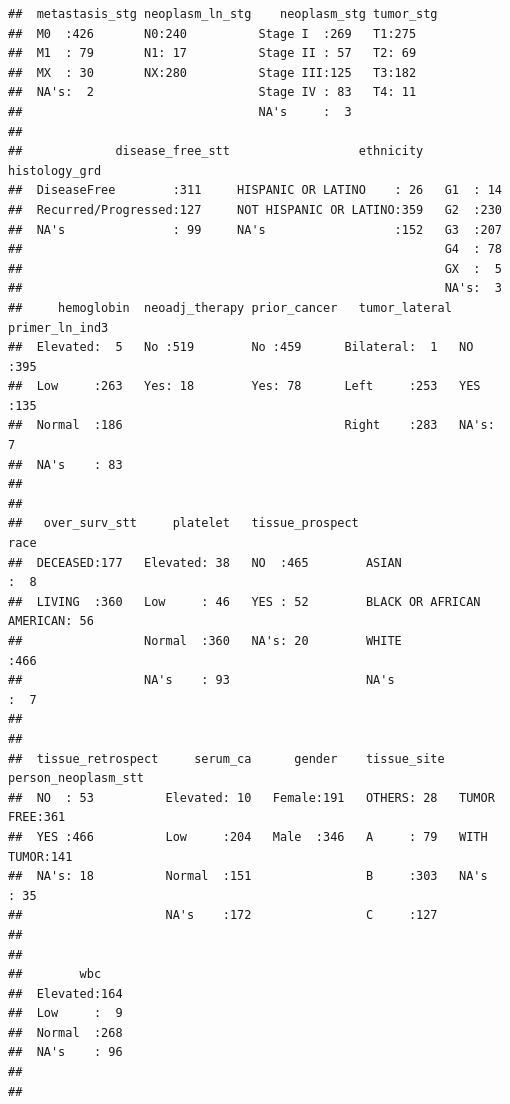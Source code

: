 \documentclass[]{article}
\begin{document}
\begin{verbatim}
##  metastasis_stg neoplasm_ln_stg    neoplasm_stg tumor_stg
##  M0  :426       N0:240          Stage I  :269   T1:275   
##  M1  : 79       N1: 17          Stage II : 57   T2: 69   
##  MX  : 30       NX:280          Stage III:125   T3:182   
##  NA's:  2                       Stage IV : 83   T4: 11   
##                                 NA's     :  3            
##                                                          
##             disease_free_stt                  ethnicity   histology_grd
##  DiseaseFree        :311     HISPANIC OR LATINO    : 26   G1  : 14     
##  Recurred/Progressed:127     NOT HISPANIC OR LATINO:359   G2  :230     
##  NA's               : 99     NA's                  :152   G3  :207     
##                                                           G4  : 78     
##                                                           GX  :  5     
##                                                           NA's:  3     
##     hemoglobin  neoadj_therapy prior_cancer   tumor_lateral primer_ln_ind3
##  Elevated:  5   No :519        No :459      Bilateral:  1   NO  :395      
##  Low     :263   Yes: 18        Yes: 78      Left     :253   YES :135      
##  Normal  :186                               Right    :283   NA's:  7      
##  NA's    : 83                                                             
##                                                                           
##                                                                           
##   over_surv_stt     platelet   tissue_prospect                        race    
##  DECEASED:177   Elevated: 38   NO  :465        ASIAN                    :  8  
##  LIVING  :360   Low     : 46   YES : 52        BLACK OR AFRICAN AMERICAN: 56  
##                 Normal  :360   NA's: 20        WHITE                    :466  
##                 NA's    : 93                   NA's                     :  7  
##                                                                               
##                                                                               
##  tissue_retrospect     serum_ca      gender    tissue_site  person_neoplasm_stt
##  NO  : 53          Elevated: 10   Female:191   OTHERS: 28   TUMOR FREE:361     
##  YES :466          Low     :204   Male  :346   A     : 79   WITH TUMOR:141     
##  NA's: 18          Normal  :151                B     :303   NA's      : 35     
##                    NA's    :172                C     :127                      
##                                                                                
##                                                                                
##        wbc     
##  Elevated:164  
##  Low     :  9  
##  Normal  :268  
##  NA's    : 96  
##                
## 
\end{verbatim}
\end{document}
